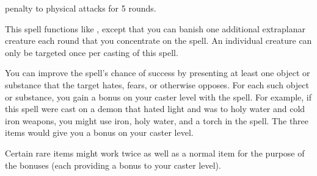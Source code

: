 \begin{comment}
\subsubsection{B}
\end{comment}

\begin{spellsuccess}
     penalty to physical attacks for 5 rounds.
\end{spellsuccess}

\begin{spelleffect}
    This spell functions like , except that you can banish one additional extraplanar creature each round that you concentrate on the spell. An individual creature can only be targeted once per casting of this spell.
\end{spelleffect}
\begin{spellnotes}
    You can improve the spell's chance of success by presenting at least one object or substance that the target hates, fears, or otherwise opposes. For each such object or substance, you gain a  bonus on your caster level with the spell. For example, if this spell were cast on a demon that hated light and was \vulnerable to holy water and cold iron weapons, you might use iron, holy water, and a torch in the spell. The three items would give you a  bonus on your caster level. 
    \par Certain rare items might work twice as well as a normal item for the purpose of the bonuses (each providing a  bonus to your caster level).
\end{spellnotes}

